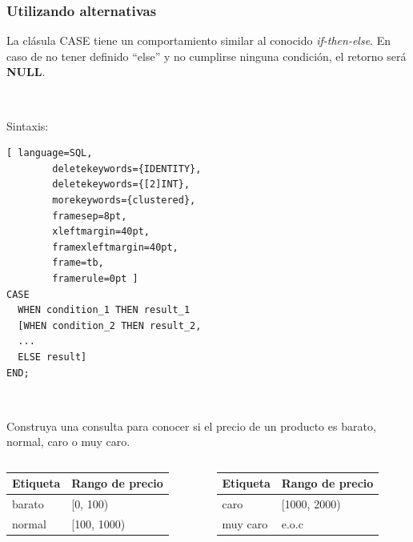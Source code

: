 \documentclass[
	10pt, %
	aspectratio=169, %
]{beamer}
\begin{document}
\begin{frame}[fragile]
	
	\frametitle{Utilizando alternativas}
	
	La clásula  \textcolor{codepurple}{CASE} tiene un comportamiento similar al conocido \emph{if-then-else}. En caso de no tener definido ``else'' y no cumplirse ninguna condición, el retorno será \textbf{NULL}.
	
	\ 
	
	Sintaxis: 
	
	\begin{lstlisting}[ language=SQL,
		deletekeywords={IDENTITY},
		deletekeywords={[2]INT},
		morekeywords={clustered},
		framesep=8pt,
		xleftmargin=40pt,
		framexleftmargin=40pt,
		frame=tb,
		framerule=0pt ]
CASE
  WHEN condition_1 THEN result_1
  [WHEN condition_2 THEN result_2, 
  ...
  ELSE result]
END;
\end{lstlisting}
	
	\pause
	
	\ 
	
	Construya una consulta para conocer si el precio de un producto es barato, normal, caro o muy caro. 
	
	\begin{columns}[t]
			\begin{table}[]
				\begin{tabular}{|l|l|}
					\hline
					Etiqueta & Rango de precio \\ \hline \hline
					barato   & {[}0, 100)        \\ \hline
					normal   & {[}100, 1000)       \\ \hline
				\end{tabular}
			\end{table}
		
		
		\begin{table}[]
			\begin{tabular}{|l|l|}
				\hline
				Etiqueta   & Rango de precio \\ \hline \hline
				caro          & {[}1000, 2000)        \\ \hline
				muy caro & e.o.c       \\ \hline
			\end{tabular}
		\end{table}

	\end{columns}
	
	
\end{frame}
\end{document}
